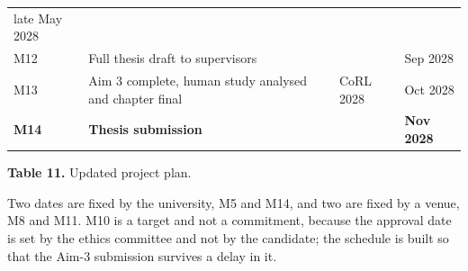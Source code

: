 \documentclass[
  11pt,
]{article}
\begin{document}
\begin{longtable}[]{@{}llll@{}}
\begin{minipage}[t]{0.15\columnwidth}
late May 2028\strut
\end{minipage}\tabularnewline
\begin{minipage}[t]{0.06\columnwidth}\raggedright
M12\strut
\end{minipage} & \begin{minipage}[t]{0.49\columnwidth}\raggedright
Full thesis draft to supervisors\strut
\end{minipage} & \begin{minipage}[t]{0.19\columnwidth}\raggedright
\strut
\end{minipage} & \begin{minipage}[t]{0.15\columnwidth}\raggedright
Sep 2028\strut
\end{minipage}\tabularnewline
\begin{minipage}[t]{0.06\columnwidth}\raggedright
M13\strut
\end{minipage} & \begin{minipage}[t]{0.49\columnwidth}\raggedright
Aim 3 complete, human study analysed and chapter final\strut
\end{minipage} & \begin{minipage}[t]{0.19\columnwidth}\raggedright
CoRL 2028\strut
\end{minipage} & \begin{minipage}[t]{0.15\columnwidth}\raggedright
Oct 2028\strut
\end{minipage}\tabularnewline
\begin{minipage}[t]{0.06\columnwidth}\raggedright
\textbf{M14}\strut
\end{minipage} & \begin{minipage}[t]{0.49\columnwidth}\raggedright
\textbf{Thesis submission}\strut
\end{minipage} & \begin{minipage}[t]{0.19\columnwidth}\raggedright
\strut
\end{minipage} & \begin{minipage}[t]{0.15\columnwidth}\raggedright
\textbf{Nov 2028}\strut
\end{minipage}\tabularnewline
\bottomrule
\end{longtable}

\textbf{Table 11.} Updated project plan.

Two dates are fixed by the university, M5 and M14, and two are fixed by
a venue, M8 and M11. M10 is a target and not a commitment, because the
approval date is set by the ethics committee and not by the candidate;
the schedule is built so that the Aim-3 submission survives a delay in
it.
\end{document}
